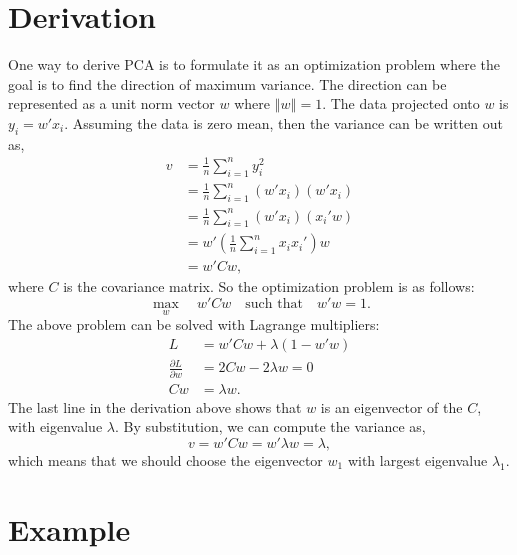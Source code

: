 \documentclass{article}
\begin{document}
\section{Derivation}

One way to derive PCA is to formulate it as an optimization problem where the goal is to find the direction of maximum variance.  The direction can be represented as a unit norm vector $w$ where $\left\Vert w \right\Vert = 1$.  The data projected onto $w$ is $y_i = w'x_i$.  Assuming the data is zero mean, then the variance can be written out as,
\begin{align}
v &= \frac{1}{n} \sum_{i=1}^n y_i^2 \\
  &= \frac{1}{n} \sum_{i=1}^n (w' x_i)(w' x_i) \\
  &= \frac{1}{n} \sum_{i=1}^n (w' x_i)(x_i' w) \\
  &= w' \left(\frac{1}{n} \sum_{i=1}^n x_i x_i'\right) w \\
  &= w' C w,
\end{align}
where $C$ is the covariance matrix.  So the optimization problem is as follows:
\begin{equation}
\max_w \quad w' C w \quad \text{such that} \quad  w'w = 1.
\end{equation}
The above problem can be solved with Lagrange multipliers:
\begin{align}
L &=  w' C w + \lambda (1 - w'w) \\
\frac{\partial L}{\partial w} &= 2Cw - 2\lambda w = 0 \\
Cw &= \lambda w.
\end{align}
The last line in the derivation above shows that $w$ is an eigenvector of the $C$, with eigenvalue $\lambda$.  By substitution, we can compute the variance as,
\begin{equation}
v = w' C w = w' \lambda w = \lambda,
\end{equation}
which means that we should choose the eigenvector $w_1$ with largest eigenvalue $\lambda_1$.

\section{Example}
\end{document}
